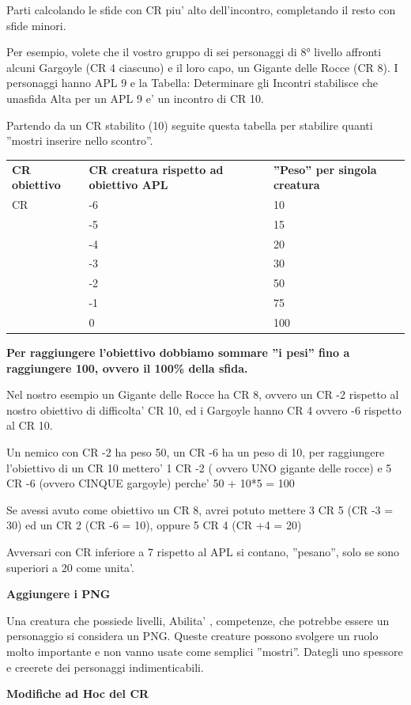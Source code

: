 \documentclass[a4paper,11pt,twoside,openany]{book}
\begin{document}
{Parti calcolando le sfide con CR piu' alto dell'incontro, completando il resto con sfide minori.

Per esempio, volete che il vostro gruppo di sei personaggi di 8° livello affronti alcuni Gargoyle (CR 4 ciascuno) e il loro capo, un Gigante delle Rocce (CR 8). I personaggi hanno APL 9 e la Tabella: Determinare gli Incontri stabilisce che unasfida Alta per un APL 9 e' un incontro di CR 10.

Partendo da un CR stabilito (10) seguite questa tabella per stabilire quanti ''mostri inserire nello scontro''.

\bigskip

\begin{tabular}{lll}
\toprule
\textbf{CR obiettivo} & \textbf{CR creatura rispetto ad obiettivo APL} & \textbf{''Peso'' per singola creatura}\tabularnewline
CR & -6 & 10\tabularnewline
 & -5 & 15\tabularnewline
 & -4 & 20\tabularnewline
 & -3 & 30\tabularnewline
 & -2 & 50\tabularnewline
 & -1 & 75\tabularnewline
 & 0 & 100\tabularnewline
\end{tabular}

\bigskip

\textbf{Per raggiungere l'obiettivo dobbiamo sommare ''i pesi''
fino a raggiungere 100, ovvero il 100\% della sfida.}

Nel nostro esempio un Gigante delle Rocce ha CR 8, ovvero un CR -2 rispetto al nostro obiettivo di difficolta' CR 10, ed i Gargoyle hanno CR 4 ovvero -6 rispetto al CR 10.

Un nemico con CR -2 ha peso 50, un CR -6 ha un peso di 10, per raggiungere l'obiettivo di un CR 10 mettero' 1 CR -2 ( ovvero UNO gigante delle rocce) e 5 CR -6 (ovvero CINQUE gargoyle) perche' 50 + 10{*}5 = 100

Se avessi avuto come obiettivo un CR 8, avrei potuto mettere 3 CR 5 (CR -3 = 30) ed un CR 2 (CR -6 = 10), oppure 5 CR 4 (CR +4 = 20)

Avversari con CR inferiore a 7 rispetto al APL si contano, ''pesano'', solo se sono superiori a 20 come unita'.

\textbf{Aggiungere i PNG}

Una creatura che possiede livelli, Abilita' , competenze, che potrebbe essere un personaggio si considera un PNG. Queste creature possono svolgere un ruolo molto importante e non vanno usate come semplici ''mostri''. Dategli uno spessore e creerete dei personaggi indimenticabili.

\textbf{Modifiche ad Hoc del CR}

}
\end{document}
